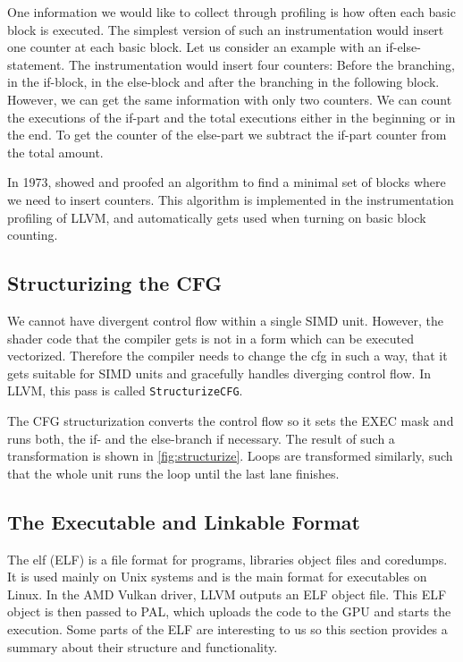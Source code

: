 One information we would like to collect through profiling is how often each basic block is executed. The simplest version of such an instrumentation would insert one counter at each basic block.
Let us consider an example with an if-else-statement. The instrumentation would insert four counters: Before the branching, in the if-block, in the else-block and after the branching in the following block. However, we can get the same information with only two counters. We can count the executions of the if-part and the total executions either in the beginning or in the end. To get the counter of the else-part we subtract the if-part counter from the total amount.

In 1973, \citet{Knuth1973} showed and proofed an algorithm to find a minimal set of blocks where we need to insert counters.
This algorithm is implemented in the instrumentation profiling of LLVM, and automatically gets used when turning on basic block counting.

\subsection{Structurizing the CFG}
\label{sub:structurize}
We cannot have divergent control flow within a single SIMD unit. However, the shader code that the compiler gets is not in a form which can be executed vectorized.
Therefore the compiler needs to change the \gls{cfg} in such a way, that it gets suitable for SIMD units and gracefully handles diverging control flow.
In LLVM, this pass is called \texttt{StructurizeCFG}.

The CFG structurization converts the control flow so it sets the EXEC mask and runs both, the if- and the else-branch if necessary. The result of such a transformation is shown in \cref{fig:structurize}. Loops are transformed similarly, such that the whole unit runs the loop until the last lane finishes.

\begin{figure}
	\centering
	
\end{figure}

\subsection{The Executable and Linkable Format}
\label{sub:elf}
The \glsdesc{elf} (ELF) is a file format for programs, libraries object files and coredumps. It is used mainly on Unix systems and is the main format for executables on Linux.
In the AMD Vulkan driver, LLVM outputs an ELF object file. This ELF object is then passed to PAL, which uploads the code to the GPU and starts the execution. Some parts of the ELF are interesting to us so this section provides a summary about their structure and functionality.

